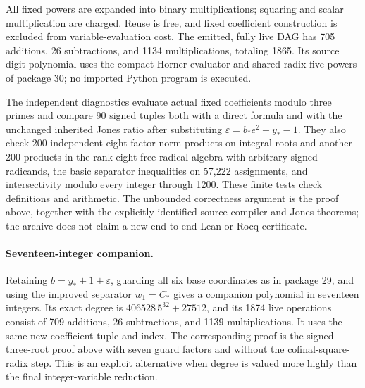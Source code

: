 All fixed powers are expanded into binary multiplications; squaring
and scalar multiplication are charged.  Reuse is free, and fixed
coefficient construction is excluded from variable-evaluation cost.
The emitted, fully live DAG has 705 additions, 26 subtractions,
and 1134 multiplications, totaling 1865.  Its source digit polynomial
uses the compact Horner evaluator and shared radix-five powers of
package 30; no imported Python program is executed.

The independent diagnostics evaluate actual fixed coefficients modulo
three primes and compare 90 signed tuples both with a direct formula
and with the unchanged inherited Jones ratio after substituting
\(\varepsilon=b_*e^2-y_*-1\).  They also check 200 independent
eight-factor norm products on integral roots and another 200 products
in the rank-eight free radical algebra with arbitrary signed radicands,
the basic separator inequalities on
57,222 assignments, and intersectivity modulo every integer through
1200.  These finite tests check definitions and arithmetic.  The
unbounded correctness argument is the proof above, together with
the explicitly identified source compiler and Jones theorems; the
archive does not claim a new end-to-end Lean or Rocq certificate.

\paragraph{Seventeen-integer companion.}
Retaining \(b=y_*+1+\varepsilon\), guarding all six base
coordinates as in package 29, and using the improved separator
\(w_1=C_*\) gives a companion polynomial in seventeen integers.
Its exact degree is \(406528\,5^{32}+27512\), and its 1874 live
operations consist of 709 additions, 26 subtractions, and 1139
multiplications.  It uses the same new coefficient tuple and index.
The corresponding proof is the signed-three-root proof above with
seven guard factors and without the cofinal-square-radix step.
This is an explicit alternative when degree is valued more highly
than the final integer-variable reduction.
